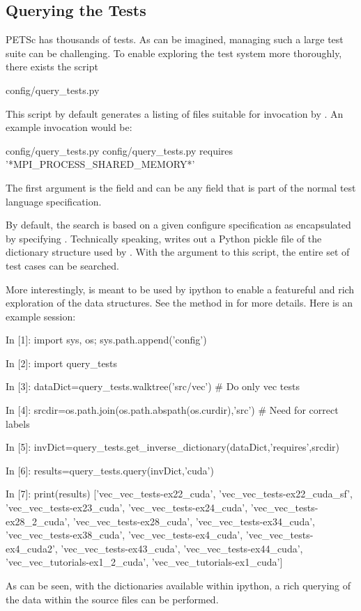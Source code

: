 \subsection{Querying the Tests}

PETSc has thousands of tests.  As can be imagined, managing such a large test
suite can be challenging.  To enable exploring the test system more thoroughly,
there exists the script 
\begin{bashlisting}
config/query_tests.py
\end{bashlisting}
This script by default generates a listing of files suitable for invocation by
.  An example invocation would be:
\begin{bashlisting}
config/query_tests.py config/query_tests.py requires '*MPI_PROCESS_SHARED_MEMORY*'
\end{bashlisting}
The first argument is the field and can be any field that is part of the normal
test language specification.

By default, the search is based on a given configure specification as
encapsulated by specifying .  Technically speaking,
 writes out a Python pickle file of the dictionary
structure used by .  With the  argument
to this script, the entire set of test cases can be searched.

More interestingly,  is meant to be used by ipython to
enable a featureful and rich exploration of the data structures.  See the 
 method in  for more details.  Here is an
example session:
\begin{bashlisting}
In [1]: import sys, os; sys.path.append('config')

In [2]: import query_tests

In [3]: dataDict=query_tests.walktree('src/vec') # Do only vec tests

In [4]: srcdir=os.path.join(os.path.abspath(os.curdir),'src') # Need for correct labels

In [5]: invDict=query_tests.get_inverse_dictionary(dataDict,'requires',srcdir)

In [6]: results=query_tests.query(invDict,'cuda')

In [7]: print(results)
['vec_vec_tests-ex22_cuda', 'vec_vec_tests-ex22_cuda_sf', 'vec_vec_tests-ex23_cuda', 'vec_vec_tests-ex24_cuda', 'vec_vec_tests-ex28_2_cuda', 'vec_vec_tests-ex28_cuda', 'vec_vec_tests-ex34_cuda', 'vec_vec_tests-ex38_cuda', 'vec_vec_tests-ex4_cuda', 'vec_vec_tests-ex4_cuda2', 'vec_vec_tests-ex43_cuda', 'vec_vec_tests-ex44_cuda', 'vec_vec_tutorials-ex1_2_cuda', 'vec_vec_tutorials-ex1_cuda']
\end{bashlisting}
As can be seen, with the dictionaries available within ipython, a rich querying
of the data within the source files can be performed.

